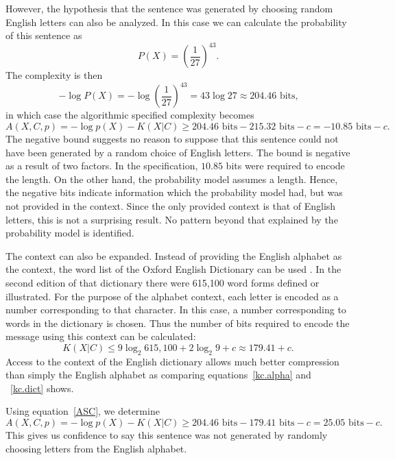 However, the hypothesis that the sentence was generated by choosing random English letters can also be analyzed.
In this case we can calculate the probability of this sentence as
\begin{equation}
    P(X) = \left(\frac{1}{27}\right)^{43} \mbox{.}
\end{equation}
The complexity is then
\begin{equation}
    -\log P(X) = -\log \left(\frac{1}{27}\right)^{43} = 43 \log 27 \approx 204.46 \mbox{ bits,}
\end{equation}
in which case the algorithmic specified complexity becomes
\begin{equation}
    A(X,C,p) = - \log p(X) - K(X|C) \geq 204.46 \mbox{ bits} - 215.32 \mbox{ bits} - c = -10.85 \mbox{ bits} - c \mbox{.}
\end{equation}
The negative bound suggests no reason to suppose that this sentence could not have been generated by a random choice of English letters.
The bound is negative as a result of two factors.
In the specification, $10.85$ bits were required to encode the length.
On the other hand, the probability model assumes a length.
Hence, the negative bits indicate information which the probability model had, but was not provided in the context.
Since the only provided context is that of English letters, this is not a surprising result.
No pattern beyond that explained by the probability model is identified.

The context can also be expanded.
Instead of providing the English alphabet as the context, the word list of the Oxford English Dictionary can be used \citep{Oxford2012}.
In the second edition of that dictionary there were 615,100 word forms defined or illustrated.
For the purpose of the alphabet context, each letter is encoded as a number corresponding to that character.
In this case, a number corresponding to words in the dictionary is chosen.
Thus the number of bits required to encode the message using this context can be calculated:
\begin{equation}
    \label{kc.dict}
    K(X|C) \leq 9 \log_2  615,100 + 2 \log_2 9 + c \approx 179.41 + c \mbox{.}
\end{equation}
Access to the context of the English dictionary allows much better compression than simply the English alphabet as comparing equations~\ref{kc.alpha} and ~\ref{kc.dict} shows.

Using equation~\ref{ASC}, we determine
\begin{equation}
    A(X,C,p) = - \log p(X) - K(X|C) \geq 204.46 \mbox{ bits} - 179.41 \mbox{ bits} - c = 25.05 \mbox{ bits} - c \mbox{.}
\end{equation}
This gives us confidence to say this sentence was not generated by randomly choosing letters from the English alphabet.

